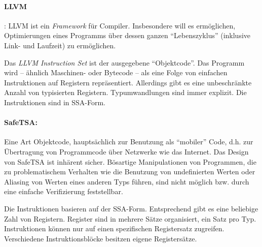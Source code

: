 \documentclass[twoside,a4paper,fleqn,12pt]{book}
\begin{document}

\paragraph{LLVM}: LLVM ist ein \emph{Framework} für Compiler. Insbesondere will es ermöglichen, Optimierungen
eines Programms über dessen ganzen "`Lebenszyklus"' (inklusive Link- und Laufzeit) zu ermöglichen.

Das \emph{LLVM Instruction Set} ist der ausgegebene "`Objektcode"'. Das Programm wird -- ähnlich Maschinen-
oder Bytecode -- als eine Folge von einfachen Instruktionen auf Registern repräsentiert. 
Allerdings gibt es eine unbeschränkte Anzahl von typisierten Registern. Typumwandlungen sind immer explizit.
Die Instruktionen sind in SSA-Form.



\paragraph{SafeTSA:} Eine Art Objektcode, hauptsächlich zur Benutzung
als "`mobiler"' Code, d.h. zur Übertragung von Programmcode über Netzwerke wie das Internet.
Das Design von SafeTSA ist inhärent sicher. Bösartige Manipulationen von Programmen, die zu
problematischem Verhalten wie die Benutzung von undefinierten Werten oder Aliasing von Werten
eines anderen Typs führen, sind nicht möglich bzw. durch eine einfache Verifizierung feststellbar.

Die Instruktionen basieren auf der SSA-Form. Entsprechend gibt es eine beliebige Zahl von Registern.
Register sind in mehrere Sätze organisiert, ein Satz pro Typ. Instruktionen können nur auf einen
spezifischen Registersatz zugreifen. Verschiedene Instruktionsblöcke besitzen eigene Registersätze.
\end{document}
